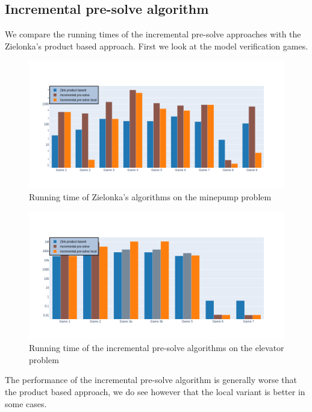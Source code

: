 \subsection{Incremental pre-solve algorithm}
We compare the running times of the incremental pre-solve approaches with the Zielonka's product based approach. First we look at the model verification games.
\begin{figure}[H]
	\includegraphics[width=1\linewidth]{"results/minepump/Zlnk product based_Incremental pre-solve_Incremental pre-solve local_"}
	\caption{Running time of Zielonka's algorithms on the minepump problem}
	\label{fig:minepumpzlnks}
\end{figure}%
\begin{figure}[H]
	\includegraphics[width=1\linewidth]{"results/elevator/Zlnk product based_Incremental pre-solve_Incremental pre-solve local_"}
	\caption{Running time of the incremental pre-solve algorithms on the elevator problem}
	\label{fig:elevatorzlnks}
\end{figure}%
The performance of the incremental pre-solve algorithm is generally worse that the product based approach, we do see however that the local variant is better in some cases.

